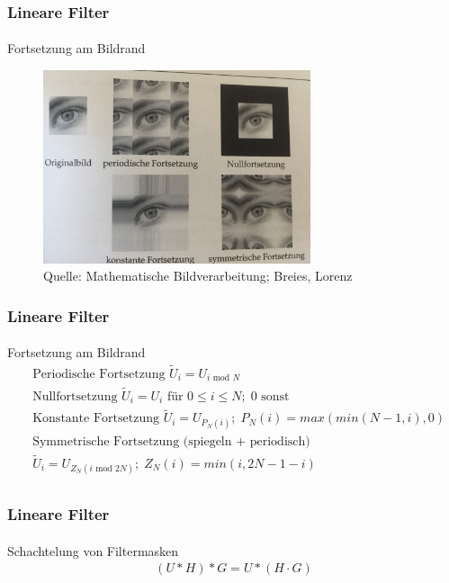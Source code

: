 \documentclass{beamer}
\begin{document}
\begin{frame}
    \frametitle{Lineare Filter}
\framesubtitle{}
\begin{block}{Fortsetzung am Bildrand}
\begin{figure}[htp]
      \centering
    \includegraphics[width=0.7\textwidth]{img/tile}
      \caption{Quelle: Mathematische Bildverarbeitung; Breies, Lorenz}
\end{figure}
\end{block}
 \end{frame}


\begin{frame}
    \frametitle{Lineare Filter}
\framesubtitle{}
\begin{block}{Fortsetzung am Bildrand}
\begin{align*}
& \text{Periodische Fortsetzung } \tilde{U}_i = U_{i \text{ mod } N} \\
& \text{Nullfortsetzung } \tilde{U}_i = U_{i} \text{ für } 0 \leq i \leq N; \; 0 \text{ sonst} \\
& \text{Konstante Fortsetzung } \tilde{U}_i = U_{P_N(i)}; \; P_N(i) = max(min (N-1,i ), 0) \\
& \text{Symmetrische Fortsetzung (spiegeln + periodisch) } \\
& \tilde{U}_i = U_{Z_N(i \text{ mod } 2 N)}; \; Z_N(i) = min (i, 2N-1-i ) \\
\end{align*}

\end{block}
 \end{frame}

\begin{frame}
    \frametitle{Lineare Filter}
\framesubtitle{}

\begin{block}{Schachtelung von Filtermasken}
\begin{align*}
(U * H) * G =  U * (H \cdot G)
\end{align*}

\end{block}

 \end{frame}
\end{document}
